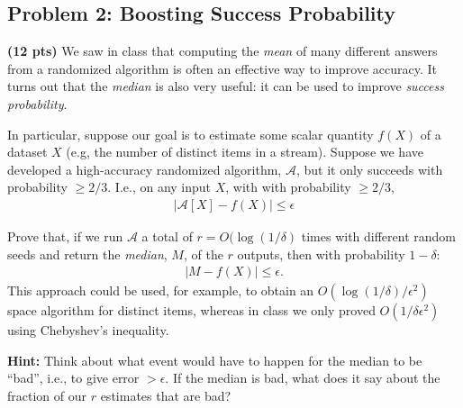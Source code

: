 \documentclass[10pt]{article}
\begin{document}
\subsection{Problem 2: Boosting Success Probability}
\textbf{(12 pts)}
We saw in class that computing the \emph{mean} of many different answers from a randomized algorithm is often an effective way to improve accuracy. It turns out that the \emph{median} is also very useful: it can be used to improve \emph{success probability}. 

In particular, suppose our goal is to estimate some scalar quantity $f(X)$ of a dataset $X$ (e.g, the number of distinct items in a stream). Suppose we have developed a high-accuracy randomized algorithm, $\mathcal{A}$, but it only succeeds with probability $\geq 2/3$. I.e., on any input $X$, with with probability $\geq 2/3$,
\begin{align*}
	|\mathcal{A}[X] - f(X)| \leq \epsilon
\end{align*}

Prove that, if we run $\mathcal{A}$ a total of $r = O(\log(1/\delta)$ times with different random seeds and return the \emph{median}, $M$, of the $r$ outputs, then with probability $1-\delta$:
\begin{align*}
		|M - f(X)| \leq \epsilon.
\end{align*}
This approach could be used, for example, to obtain an $O(\log(1/\delta)/\epsilon^2)$ space algorithm for distinct items, whereas in class we only proved $O(1/\delta\epsilon^2)$ using Chebyshev's inequality. 

\vspace{1em}
\noindent \textbf{Hint:} Think about what event would have to happen for the median to be ``bad'', i.e., to give error $> \epsilon$. If the median is bad, what does it say about the fraction of our $r$ estimates that are bad?



\end{document}
